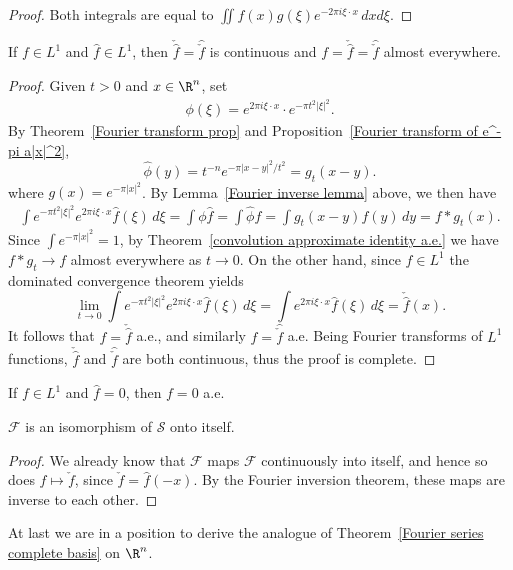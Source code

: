 \begin{proof}
Both integrals are equal to $\iint f(x)g(\xi)e^{-2\pi i\xi\cdot x}\,dxd\xi$.
\end{proof}
\begin{theorem}
If $f\in L^1$ and $\hat{f}\in L^1$, then $\check{\hat{f}}=\hat{\check{f}}$ is continuous and $f=\check{\hat{f}}=\hat{\check{f}}$ almost everywhere.
\end{theorem}
\begin{proof}
Given $t>0$ and $x\in\R^n$, set
\begin{align*}
\phi(\xi)=e^{2\pi i\xi\cdot x}\cdot e^{-\pi t^2|\xi|^2}.
\end{align*}
By Theorem~\ref{Fourier transform prop} and Proposition~\ref{Fourier transform of e^-pi a|x|^2},
\[\hat{\phi}(y)=t^{-n}e^{-\pi|x-y|^2/t^2}=g_t(x-y).\]
where $g(x)=e^{-\pi|x|^2}$. By Lemma~\ref{Fourier inverse lemma} above, we then have
\begin{align*}
\int e^{-\pi t^2|\xi|^2}e^{2\pi i\xi\cdot x}\hat{f}(\xi)\,d\xi=\int\phi\hat{f}=\int\hat{\phi}f=\int g_t(x-y)f(y)\,dy=f\ast g_t(x).
\end{align*}
Since $\int e^{-\pi|x|^2}=1$, by Theorem~\ref{convolution approximate identity a.e.} we have $f\ast g_t\to f$ almost everywhere as $t\to 0$. On the other hand, since $\hat{f}\in L^1$ the dominated convergence theorem yields
\[\lim_{t\to 0}\int e^{-\pi t^2|\xi|^2}e^{2\pi i\xi\cdot x}\hat{f}(\xi)\,d\xi=\int e^{2\pi i\xi\cdot x}\hat{f}(\xi)\,d\xi=\check{\hat{f}}(x).\]
It follows that $f=\check{\hat{f}}$ a.e., and similarly $f=\hat{\check{f}}$ a.e. Being Fourier transforms of $L^1$ functions, $\check{\hat{f}}$ and $\hat{\check{f}}$ are both continuous, thus the proof is complete.
\end{proof}
\begin{corollary}
If $f\in L^1$ and $\hat{f}=0$, then $f=0$ a.e.
\end{corollary}
\begin{corollary}
$\mathcal{F}$ is an isomorphism of $\mathscr{S}$ onto itself.
\end{corollary}
\begin{proof}
We already know that $\mathcal{F}$ maps $\mathcal{F}$ continuously into itself, and hence so does $f\mapsto\check{f}$, since $\check{f}=\hat{f}(-x)$. By the Fourier inversion theorem, these maps are inverse to each other.
\end{proof}
At last we are in a position to derive the analogue of Theorem~\ref{Fourier series complete basis} on $\R^n$.

